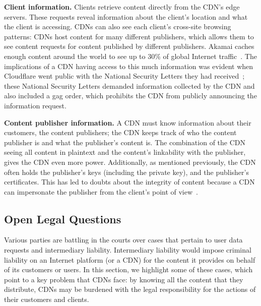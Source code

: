 \textbf{Client information.} Clients retrieve content directly from the
CDN's edge servers. These requests reveal
information about the client's location and what the client is accessing.  
CDNs can also see each client's cross-site browsing patterns: CDNs host content
for
many different publishers, which allows 
them to see content requests for content published by different publishers.  Akamai caches enough content around the world to see up to 30\% of global Internet 
traffic~\cite{akamai_global_traffic}.  The implications of a CDN having access to
this much information was evident when Cloudflare
went public with the National Security Letters they had received~\cite{cloudflare_nsl};
these National Security Letters
demanded information collected by the CDN and also included a gag order, which prohibits
the CDN from publicly announcing the information request.  

\textbf{Content publisher information.} A CDN must know information
about their customers, the content
publishers; the CDN keeps track of who the content publisher is and 
what the publisher's content is.  The combination of the CDN seeing all content in plaintext and the content's 
linkability with the publisher, gives the CDN even more power.  Additionally, as mentioned previously, the CDN often 
holds the publisher's keys (including the private key), and the publisher's certificates.  This has led to doubts 
about the integrity of content because a CDN can impersonate the publisher from the client's point of view~\cite{levy2015stickler}.

\subsection{Open Legal Questions}

Various parties are battling in the courts over cases that pertain to user
data requests and intermediary liability.  Intermediary liability would impose
criminal liability on an Internet platform (or a CDN) for the content it
provides on behalf of its customers or users. In this section, we highlight
some of these cases, which point to a key problem that CDNs face: by knowing
all the content that they distribute, CDNs may be burdened with the legal
responsibility for the actions of their customers and clients.

